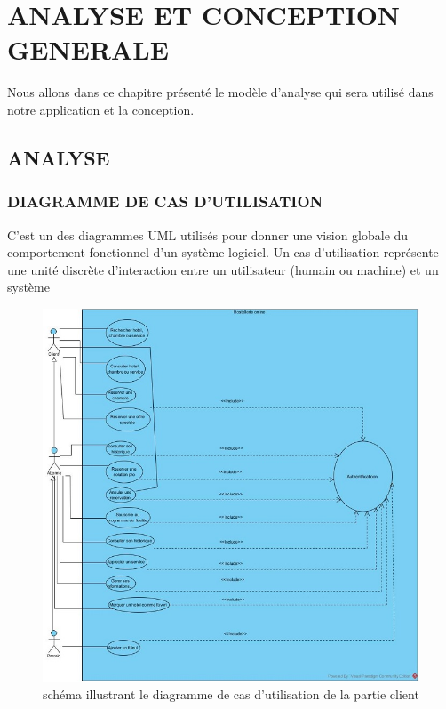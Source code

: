 \chapter{ANALYSE ET CONCEPTION GENERALE}


Nous allons dans ce chapitre présenté le modèle d’analyse qui sera utilisé dans notre application et la conception.

\section{ANALYSE} 

\subsection{DIAGRAMME DE CAS D’UTILISATION}
C’est un des diagrammes UML utilisés pour donner une vision globale du comportement fonctionnel d'un système logiciel. Un cas d'utilisation représente une unité discrète d'interaction entre un utilisateur (humain ou machine) et un système


\begin{figure}[h]
	\begin{center}
		\includegraphics[scale=0.8]{images/diag_use_case1.jpg}
		\caption{schéma illustrant le diagramme de cas d’utilisation de la partie client}
		\label{synthese-cout-salarieg}
	\end{center}
\end{figure}

